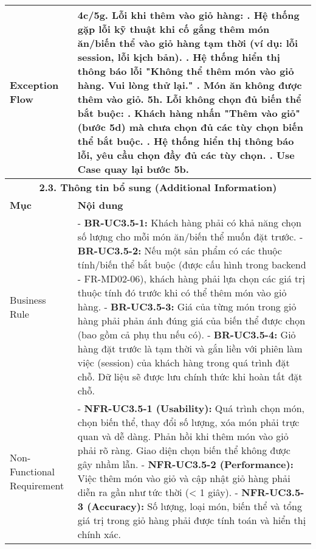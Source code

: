 \begin{longtable}{|m{4cm}|p{11cm}|}
\hline
Exception Flow & \textbf{4c/5g. Lỗi khi thêm vào giỏ hàng:} \newline    1. Hệ thống gặp lỗi kỹ thuật khi cố gắng thêm món ăn/biến thể vào giỏ hàng tạm thời (ví dụ: lỗi session, lỗi kịch bản). \newline    2. Hệ thống hiển thị thông báo lỗi "Không thể thêm món vào giỏ hàng. Vui lòng thử lại." \newline    3. Món ăn không được thêm vào giỏ. \newline \textbf{5h. Lỗi không chọn đủ biến thể bắt buộc:} \newline    1. Khách hàng nhấn "Thêm vào giỏ" (bước 5d) mà chưa chọn đủ các tùy chọn biến thể bắt buộc. \newline    2. Hệ thống hiển thị thông báo lỗi, yêu cầu chọn đầy đủ các tùy chọn. \newline    3. Use Case quay lại bước 5b. \\
\hline
\multicolumn{2}{|c|}{\textbf{2.3. Thông tin bổ sung (Additional Information)}} \\
\hline
\textbf{Mục} & \textbf{Nội dung} \\
\hline
Business Rule & - \textbf{BR-UC3.5-1:} Khách hàng phải có khả năng chọn số lượng cho mỗi món ăn/biến thể muốn đặt trước. \newline - \textbf{BR-UC3.5-2:} Nếu một sản phẩm có các thuộc tính/biến thể bắt buộc (được cấu hình trong backend - FR-MD02-06), khách hàng phải lựa chọn các giá trị thuộc tính đó trước khi có thể thêm món vào giỏ hàng. \newline - \textbf{BR-UC3.5-3:} Giá của từng món trong giỏ hàng phải phản ánh đúng giá của biến thể được chọn (bao gồm cả phụ thu nếu có). \newline - \textbf{BR-UC3.5-4:} Giỏ hàng đặt trước là tạm thời và gắn liền với phiên làm việc (session) của khách hàng trong quá trình đặt chỗ. Dữ liệu sẽ được lưu chính thức khi hoàn tất đặt chỗ. \\
\hline
Non-Functional Requirement & - \textbf{NFR-UC3.5-1 (Usability):} Quá trình chọn món, chọn biến thể, thay đổi số lượng, xóa món phải trực quan và dễ dàng. Phản hồi khi thêm món vào giỏ phải rõ ràng. Giao diện chọn biến thể không được gây nhầm lẫn. \newline - \textbf{NFR-UC3.5-2 (Performance):} Việc thêm món vào giỏ và cập nhật giỏ hàng phải diễn ra gần như tức thời (< 1 giây). \newline - \textbf{NFR-UC3.5-3 (Accuracy):} Số lượng, loại món, biến thể và tổng giá trị trong giỏ hàng phải được tính toán và hiển thị chính xác. \\
\hline
\end{longtable}

